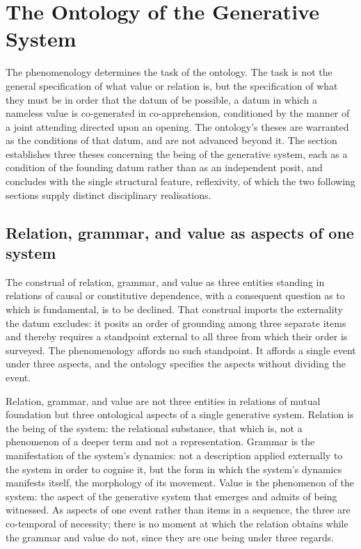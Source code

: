 \section{The Ontology of the Generative System}
\label{p10:sec:ontology}

\noindent
The phenomenology determines the task of the ontology. The task is not the general specification of what value or relation is, but the specification of what they must be in order that the datum of  be possible, a datum in which a nameless value is co-generated in co-apprehension, conditioned by the manner of a joint attending directed upon an opening. The ontology's theses are warranted as the conditions of that datum, and are not advanced beyond it. The section establishes three theses concerning the being of the generative system, each as a condition of the founding datum rather than as an independent posit, and concludes with the single structural feature, reflexivity, of which the two following sections supply distinct disciplinary realisations.

\subsection{Relation, grammar, and value as aspects of one system}
\label{p10:sec:three-aspects}

The construal of relation, grammar, and value as three entities standing in relations of causal or constitutive dependence, with a consequent question as to which is fundamental, is to be declined. That construal imports the externality the datum excludes: it posits an order of grounding among three separate items and thereby requires a standpoint external to all three from which their order is surveyed. The phenomenology affords no such standpoint. It affords a single event under three aspects, and the ontology specifies the aspects without dividing the event.

\begin{claim}
Relation, grammar, and value are not three entities in relations of mutual foundation but three ontological aspects of a single generative system. Relation is the being of the system: the relational substance, that which is, not a phenomenon of a deeper term and not a representation. Grammar is the manifestation of the system's dynamics: not a description applied externally to the system in order to cognise it, but the form in which the system's dynamics manifests itself, the morphology of its movement. Value is the phenomenon of the system: the aspect of the generative system that emerges and admits of being witnessed. As aspects of one event rather than items in a sequence, the three are co-temporal of necessity; there is no moment at which the relation obtains while the grammar and value do not, since they are one being under three regards.
\end{claim}

